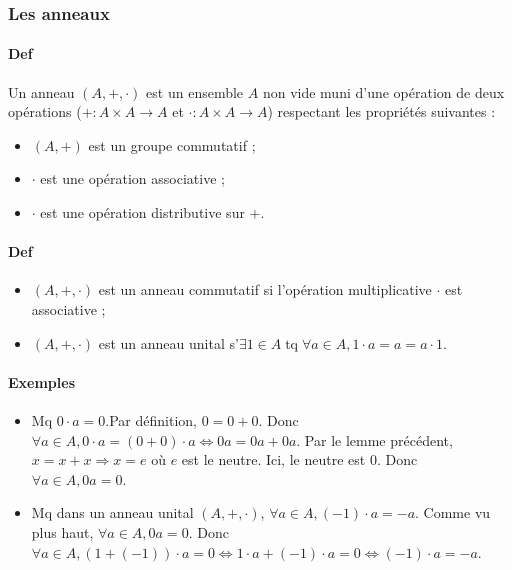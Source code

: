 \documentclass{article}
\newenvironment{lst}
	{\begin{minipage}[t]{.9\linewidth}\begin{itemize}}
	{\end{itemize}\end{minipage}}
\DeclareMathOperator{\tq}{\text{ tq }}
\begin{document}
			\subsubsection{Les anneaux}

			\paragraph{Def} Un anneau $(A, +, \cdot)$ est un ensemble $A$ non vide muni d'une opération de deux opérations ($+ : A \times A \to A$
			et $\cdot : A \times A \to A$) respectant les propriétés suivantes :

			\begin{itemize}
				\item $(A, +)$ est un groupe commutatif ;
				\item $\cdot$ est une opération associative ;
				\item $\cdot$ est une opération distributive sur $+$.
			\end{itemize}

			\paragraph{Def}
			\begin{lst}
				\item $(A, +, \cdot)$ est un anneau commutatif si l'opération multiplicative $\cdot$ est associative ;
				\item $(A, +, \cdot)$ est un anneau unital s'$\exists 1 \in A \tq \forall a \in A, 1 \cdot a = a = a \cdot 1$.
			\end{lst}

			\paragraph{Exemples}
			\begin{lst}
				\item Mq $0 \cdot a = 0$.Par définition, $0 = 0 + 0$. Donc $\forall a \in A, 0 \cdot a = (0 + 0) \cdot a \iff 0a = 0a + 0a$.
				Par le lemme précédent, $x = x + x \Rightarrow x = e$ où $e$ est le neutre. Ici, le neutre est $0$. Donc $\forall a \in A, 0a = 0$.
				\item Mq dans un anneau unital $(A, +, \cdot)$, $\forall a \in A, (-1) \cdot a = -a$. Comme vu plus haut, $\forall a \in A, 0a = 0$.
				Donc $\forall a \in A, (1 + (-1)) \cdot a = 0 \iff 1 \cdot a + (-1) \cdot a = 0 \iff (-1) \cdot a = -a$.
			\end{lst}
\end{document}
